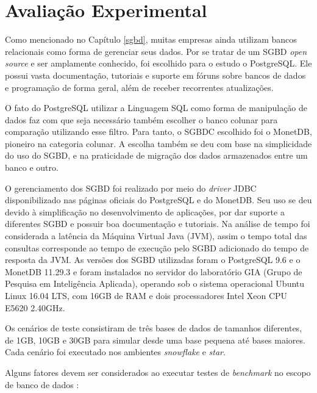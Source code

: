 \graphicspath{ {6-Experimento/} }

\chapter{Avaliação Experimental}

Como mencionado no Capítulo \ref{sgbd}, muitas empresas ainda utilizam 
bancos relacionais como forma de gerenciar seus dados. 
Por se tratar de um SGBD \textit{open source} e ser amplamente 
conhecido, foi escolhido para o estudo o PostgreSQL. Ele possui vasta 
documentação, tutoriais e suporte em fóruns sobre bancos de dados e 
programação de forma geral, além de receber recorrentes atualizações. 

O fato do PostgreSQL utilizar a Linguagem SQL como forma de 
manipulação de dados faz com que seja necessário também escolher 
o banco colunar para comparação utilizando esse filtro. Para tanto, o 
SGBDC escolhido foi o MonetDB, pioneiro na categoria colunar. A escolha também 
se deu com base na simplicidade do uso do SGBD, e na praticidade de 
migração dos dados armazenados entre um banco e outro. 

O gerenciamento dos SGBD foi realizado por meio do \textit{driver} JDBC 
disponibilizado nas páginas oficiais do PostgreSQL e do MonetDB. Seu uso se deu 
devido à simplificação no desenvolvimento de aplicações, por dar suporte a 
diferentes SGBD e possuir boa documentação e tutoriais. Na análise de tempo 
foi considerada a latência da Máquina Virtual Java (JVM), assim o tempo total 
das consultas corresponde ao tempo de execução pelo SGBD adicionado 
do tempo de resposta da JVM. As versões dos SGBD utilizadas 
foram o PostgreSQL 9.6 e o MonetDB 11.29.3 e foram instalados no servidor do laboratório GIA (Grupo de Pesquisa em Inteligência Aplicada), operando sob o 
sistema operacional Ubuntu Linux 16.04 LTS, com 16GB de RAM e dois 
processadores Intel Xeon CPU E5620 2.40GHz.

Os cenários de teste consistiram de três bases de dados de tamanhos 
diferentes, de 1GB, 10GB e 30GB para simular desde uma base pequena 
até bases maiores. Cada cenário foi executado nos ambientes \textit{snowflake} e 
\textit{star}.

Alguns fatores devem ser considerados ao executar testes de \textit{benchmark} 
no escopo de banco de dados \cite{raasveldt2018fair}:


